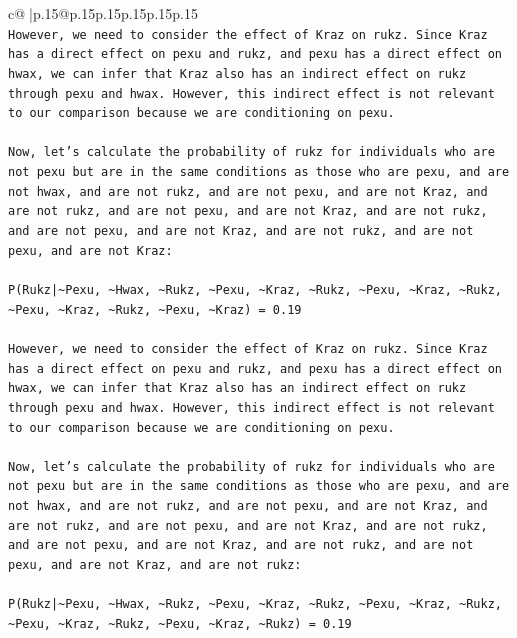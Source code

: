 \documentclass{article}
\begin{document}
{\begin{supertabular}{c@{$\;$}|p{.15\linewidth}@{}p{.15\linewidth}p{.15\linewidth}p{.15\linewidth}p{.15\linewidth}p{.15\linewidth}}
{{{\\ 
\texttt{However, we need to consider the effect of Kraz on rukz. Since Kraz has a direct effect on pexu and rukz, and pexu has a direct effect on hwax, we can infer that Kraz also has an indirect effect on rukz through pexu and hwax. However, this indirect effect is not relevant to our comparison because we are conditioning on pexu.} \\
\\ 
\texttt{Now, let's calculate the probability of rukz for individuals who are not pexu but are in the same conditions as those who are pexu, and are not hwax, and are not rukz, and are not pexu, and are not Kraz, and are not rukz, and are not pexu, and are not Kraz, and are not rukz, and are not pexu, and are not Kraz, and are not rukz, and are not pexu, and are not Kraz:} \\
\\ 
\texttt{P(Rukz|\textasciitilde{}Pexu, \textasciitilde{}Hwax, \textasciitilde{}Rukz, \textasciitilde{}Pexu, \textasciitilde{}Kraz, \textasciitilde{}Rukz, \textasciitilde{}Pexu, \textasciitilde{}Kraz, \textasciitilde{}Rukz, \textasciitilde{}Pexu, \textasciitilde{}Kraz, \textasciitilde{}Rukz, \textasciitilde{}Pexu, \textasciitilde{}Kraz) = 0.19} \\
\\ 
\texttt{However, we need to consider the effect of Kraz on rukz. Since Kraz has a direct effect on pexu and rukz, and pexu has a direct effect on hwax, we can infer that Kraz also has an indirect effect on rukz through pexu and hwax. However, this indirect effect is not relevant to our comparison because we are conditioning on pexu.} \\
\\ 
\texttt{Now, let's calculate the probability of rukz for individuals who are not pexu but are in the same conditions as those who are pexu, and are not hwax, and are not rukz, and are not pexu, and are not Kraz, and are not rukz, and are not pexu, and are not Kraz, and are not rukz, and are not pexu, and are not Kraz, and are not rukz, and are not pexu, and are not Kraz, and are not rukz:} \\
\\ 
\texttt{P(Rukz|\textasciitilde{}Pexu, \textasciitilde{}Hwax, \textasciitilde{}Rukz, \textasciitilde{}Pexu, \textasciitilde{}Kraz, \textasciitilde{}Rukz, \textasciitilde{}Pexu, \textasciitilde{}Kraz, \textasciitilde{}Rukz, \textasciitilde{}Pexu, \textasciitilde{}Kraz, \textasciitilde{}Rukz, \textasciitilde{}Pexu, \textasciitilde{}Kraz, \textasciitilde{}Rukz) = 0.19} \\
}}}
\end{supertabular}}
\end{document}
